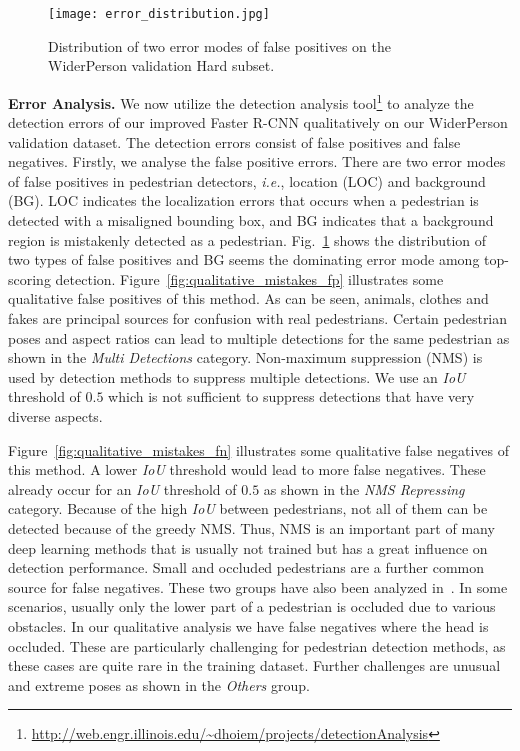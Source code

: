 \documentclass[journal]{IEEEtran}
\def\ie{{\em i.e.}}
\begin{document}
\begin{figure}[t]
\centering
\texttt{[image: error\_distribution.jpg]}
\caption{Distribution of two error modes of false positives on the WiderPerson validation Hard subset.}
\label{fig:err_dist}
\end{figure}

{\flushleft \textbf{Error Analysis. }}
We now utilize the detection analysis tool\footnote{\url{http://web.engr.illinois.edu/~dhoiem/projects/detectionAnalysis}} to analyze the detection errors of our improved Faster R-CNN qualitatively on our WiderPerson validation dataset. The detection errors consist of false positives and false negatives. Firstly, we analyse the false positive errors. There are two error modes of false positives in pedestrian detectors, \ie, location (LOC) and background (BG). LOC indicates the localization errors that occurs when a pedestrian is detected with a misaligned bounding box, and BG indicates that a background region is mistakenly detected as a pedestrian. Fig.~\ref{fig:err_dist} shows the distribution of two types of false positives and BG seems the dominating error mode among top-scoring detection. Figure~\ref{fig:qualitative_mistakes_fp} illustrates some qualitative false positives of this method. As can be seen, animals, clothes and fakes are principal sources for confusion with real pedestrians. Certain pedestrian poses and aspect ratios can lead to multiple detections for the same pedestrian as shown in the \textit{Multi Detections} category. Non-maximum suppression (NMS) is used by detection methods to suppress multiple detections. We use an \textit{IoU} threshold of $0.5$ which is not sufficient to suppress detections that have very diverse aspects.

Figure~\ref{fig:qualitative_mistakes_fn} illustrates some qualitative false negatives of this method. A lower \textit{IoU} threshold would lead to more false negatives. These already occur for an \textit{IoU} threshold of $0.5$ as shown in the \textit{NMS Repressing} category. Because of the high \textit{IoU} between pedestrians, not all of them can be detected because of the greedy NMS. Thus, NMS is an important part of many deep learning methods that is usually not trained but has a great influence on detection performance. Small and occluded pedestrians are a further common source for false negatives. These two groups have also been analyzed in~\cite{DBLP:conf/itsc/RajaramOT15}. In some scenarios, usually only the lower part of a pedestrian is occluded due to various obstacles. In our qualitative analysis we have false negatives where the head is occluded. These are particularly challenging for pedestrian detection methods, as these cases are quite rare in the training dataset. Further challenges are unusual and extreme poses as shown in the \textit{Others} group.
\end{document}
